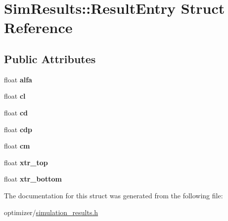 \hypertarget{struct_sim_results_1_1_result_entry}{}\section{Sim\+Results\+:\+:Result\+Entry Struct Reference}
\label{struct_sim_results_1_1_result_entry}
\subsection*{Public Attributes}
\begin{DoxyCompactItemize}
\item 
\hypertarget{struct_sim_results_1_1_result_entry_a4945317511d8f3a87e10de9bf0019f64}{}\label{struct_sim_results_1_1_result_entry_a4945317511d8f3a87e10de9bf0019f64} 
float {\bfseries alfa}
\item 
\hypertarget{struct_sim_results_1_1_result_entry_a54791ccd1e7fdce9df6b2391fb1a949b}{}\label{struct_sim_results_1_1_result_entry_a54791ccd1e7fdce9df6b2391fb1a949b} 
float {\bfseries cl}
\item 
\hypertarget{struct_sim_results_1_1_result_entry_a2eb610ab85a129e1b4dd1a7c23780a9b}{}\label{struct_sim_results_1_1_result_entry_a2eb610ab85a129e1b4dd1a7c23780a9b} 
float {\bfseries cd}
\item 
\hypertarget{struct_sim_results_1_1_result_entry_a5bb0f114efdda448da3ad8ca9bb7f8f4}{}\label{struct_sim_results_1_1_result_entry_a5bb0f114efdda448da3ad8ca9bb7f8f4} 
float {\bfseries cdp}
\item 
\hypertarget{struct_sim_results_1_1_result_entry_a815ca0822959da7eddd613b6be147dae}{}\label{struct_sim_results_1_1_result_entry_a815ca0822959da7eddd613b6be147dae} 
float {\bfseries cm}
\item 
\hypertarget{struct_sim_results_1_1_result_entry_abae3d17c084954b399d4d2bf856f4df2}{}\label{struct_sim_results_1_1_result_entry_abae3d17c084954b399d4d2bf856f4df2} 
float {\bfseries xtr\+\_\+top}
\item 
\hypertarget{struct_sim_results_1_1_result_entry_af84835f44591744a0b1a42a435a23ad7}{}\label{struct_sim_results_1_1_result_entry_af84835f44591744a0b1a42a435a23ad7} 
float {\bfseries xtr\+\_\+bottom}
\end{DoxyCompactItemize}


The documentation for this struct was generated from the following file\+:\begin{DoxyCompactItemize}
\item 
optimizer/\hyperlink{simulation__results_8h}{simulation\+\_\+results.\+h}\end{DoxyCompactItemize}
